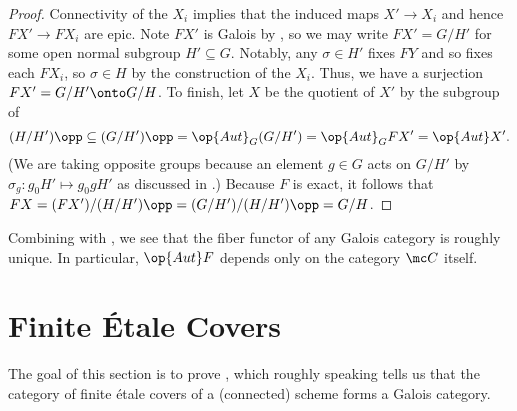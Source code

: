 \documentclass{amsart}
\begin{document}
\begin{proof}
    Connectivity of the $X_i$ implies that the induced maps $X'\to X_i$ and hence $FX'\to FX_i$ are epic. Note $FX'$ is Galois by , so we may write $FX'=G/H'$ for some open normal subgroup $H'\subseteq G$. Notably, any $\sigma\in H'$ fixes $FY$ and so fixes each $FX_i$, so $\sigma\in H$ by the construction of the $X_i$. Thus, we have a surjection $FX'=G/H'\onto G/H$. To finish, let $X$ be the quotient of $X'$ by the subgroup of
    \[(H/H')\opp\subseteq(G/H')\opp=\op{Aut}_G(G/H')=\op{Aut}_GFX'=\op{Aut}X'.\]
    (We are taking opposite groups because an element $g\in G$ acts on $G/H'$ by $\sigma_g\colon g_0H'\mapsto g_0gH'$ as discussed in .) Because $F$ is exact, it follows that $FX=(FX')/(H/H')\opp=(G/H')/(H/H')\opp=G/H$.
\end{proof}
\begin{remark} \label{rem:fiber-functor-unique}
    Combining  with , we see that the fiber functor of any Galois category is roughly unique. In particular, $\op{Aut}F$ depends only on the category $\mc C$ itself.
\end{remark}

\section{Finite \'Etale Covers} \label{sec:finite-et-covers}
The goal of this section is to prove , which roughly speaking tells us that the category of finite \'etale covers of a (connected) scheme forms a Galois category.
\end{document}
